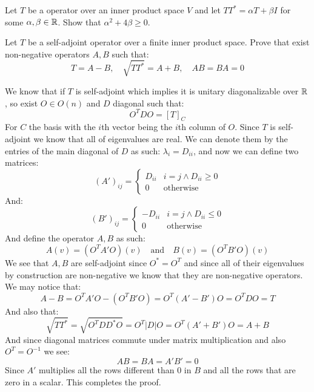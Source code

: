 \documentclass[11pt, a4paper]{article}
\begin{document}
\begin{exercise}
  Let $T$ be a operator over an inner product space $V$ and let 
  $TT^{*}=\alpha T + \beta I$ for some $\alpha,\beta\in\mathbb{R}$.
  Show that $\alpha^2+4\beta \ge 0$.
\end{exercise}



\begin{exercise}
  Let $T$ be a self-adjoint operator over a finite inner product space.
  Prove that exist non-negative operators $A,B$ such that:
  \[
    T = A-B,\quad \sqrt{TT^{*}}=A+B,\quad AB=BA=0
  \]
\end{exercise}
\begin{solution}
  We know that if $T$ is self-adjoint which implies it is unitary 
  diagonalizable over $\mathbb{R}$, so exist $O\in O(n)$ and $D$ diagonal such that:
  \[
    O^{T}DO = [T]_C
  \]
  For $C$ the basis with the $i$th vector being the $i$th column of $O$.
  Since $T$ is self-adjoint we know that all of eigenvalues are real.
  We can denote them by the entries of the main diagonal of $D$ as such:
  $\lambda_i = D_{ii}$, and now we can define two matrices:
  \[
    (A')_{ij} = 
    \begin{cases}
      D_{ii} & i=j \land D_{ii} \geq 0 \\
      0 & \text{otherwise}
    \end{cases}
  \]
  And:
  \[
    (B')_{ij} = 
    \begin{cases}
      -D_{ii} & i=j \land D_{ii} \leq 0 \\
      0 & \text{otherwise}
    \end{cases}
  \]
  And define the operator $A,B$ as such:
  \[
    A(v) = (O^{T} A' O)(v) \quad\text{and}\quad B(v) = (O^{T} B' O)(v)
  \]
  We see that $A,B$ are self-adjoint since $O^* = O^{T}$ and since all of
  their eigenvalues by construction are non-negative we know that they are
  non-negative operators. We may notice that:
  \[
    A - B = O^{T} A' O - (O^{T} B' O) = O^{T} (A'-B') O = O^{T} D O = T
  \]
  And also that:
  \[
    \sqrt{TT^*} = \sqrt{O^{T} DD^* O} = O^{T} |D| O = O^{T} (A'+B') O = 
    A+B
  \]
  And since diagonal matrices commute under matrix multiplication and also
  $O^{T} = O^{-1}$ we see:
  \[
    AB = BA = A'B' = 0
  \]
  Since $A'$ multiplies all the rows different than $0$ in $B$ and all the rows
  that are zero in a scalar. This completes the proof.
\end{solution}
\end{document}
